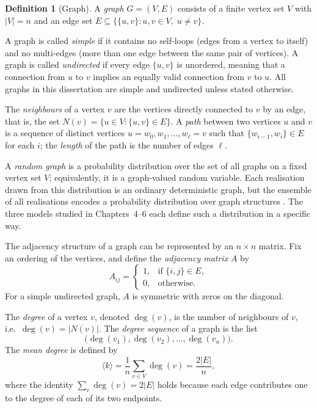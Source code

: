 \documentclass[12pt, a4paper]{report}
\theoremstyle{definition}
\newtheorem{definition}{Definition}[chapter]
\theoremstyle{plain}
\theoremstyle{remark}
\begin{document}
\begin{definition}[Graph]
  A \emph{graph} $G = (V, E)$ consists of a finite vertex set $V$
  with $|V| = n$ and an edge set
  $E \subseteq \bigl\{\{u,v\} : u,v \in V,\; u \neq v\bigr\}$.
\end{definition}

A graph is called \emph{simple} if it contains no self-loops
(edges from a vertex to itself) and no multi-edges (more than
one edge between the same pair of vertices). A graph is called
\emph{undirected} if every edge $\{u,v\}$ is unordered, meaning
that a connection from $u$ to $v$ implies an equally valid
connection from $v$ to $u$. All graphs in this dissertation are
simple and undirected unless stated otherwise.

The \emph{neighbours} of a vertex $v$ are the vertices directly
connected to $v$ by an edge, that is, the set
$N(v) = \{u \in V : \{u,v\} \in E\}$.
A \emph{path} between two vertices $u$ and $v$ is a sequence of
distinct vertices $u = w_0, w_1, \dots, w_\ell = v$ such that
$\{w_{i-1}, w_i\} \in E$ for each $i$; the \emph{length} of the
path is the number of edges $\ell$.

A \emph{random graph} is a probability distribution over the set
of all graphs on a fixed vertex set $V$; equivalently, it is a
graph-valued random variable. Each realisation drawn from this
distribution is an ordinary deterministic graph, but the
ensemble of all realisations encodes a probability distribution
over graph structures \cite{hofstad2017}. The three models
studied in Chapters~4--6 each define such a distribution in a
specific way.

The adjacency structure of a graph can be represented by an 
$n \times n$ matrix. Fix an ordering of the vertices, and 
define the \emph{adjacency matrix} $A$ by
\[
  A_{ij} =
  \begin{cases}
    1, & \text{if } \{i,j\} \in E,\\
    0, & \text{otherwise}.
  \end{cases}
\]
For a simple undirected graph, $A$ is symmetric with zeros on
the diagonal.

The \emph{degree} of a vertex $v$, denoted $\deg(v)$, is the 
number of neighbours of $v$, i.e.\ $\deg(v) = |N(v)|$.
The \emph{degree sequence} of a graph is the list
\[
  \bigl(\deg(v_1), \deg(v_2), \dots, \deg(v_n)\bigr).
\]
The \emph{mean degree} is defined by
\[
  \langle k \rangle
  = \frac{1}{n} \sum_{v \in V} \deg(v)
  = \frac{2|E|}{n},
\]
where the identity $\sum_v \deg(v) = 2|E|$ holds because each
edge contributes one to the degree of each of its two endpoints.
\end{document}
